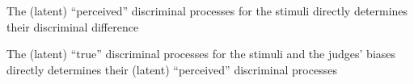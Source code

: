 \documentclass[
  authoryear,
  review,
  1p]{elsarticle}
\begin{document}
The (latent) ``perceived'' discriminal processes for the stimuli
directly determines their discriminal difference

The (latent) ``true'' discriminal processes for the stimuli and the
judges' biases directly determines their (latent) ``perceived''
discriminal processes

\begin{figure}


\caption{\label{fig-CJ_TM_01}}

\end{figure}%

\begin{figure}


\caption{\label{fig-CJ_TM_02}}

\end{figure}%

\begin{figure}


\caption{\label{fig-CJ_TM_03}}

\end{figure}%
\end{document}
